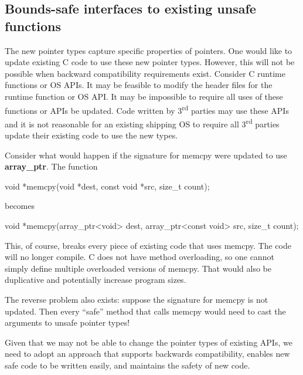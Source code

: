 \subsection{\texorpdfstring{\protect\hypertarget{ux5fToc426641113}{}{\protect\hypertarget{ux5fToc435434972}{}{\protect\hypertarget{ux5fToc437460803}{}{\protect\hypertarget{ux5fRef437611522}{}{\protect\hypertarget{ux5fToc440445484}{}{\protect\hypertarget{ux5fToc440449266}{}{\protect\hypertarget{ux5fToc440551916}{}{}}}}}}}Bounds-safe
interfaces to existing unsafe
functions}{Bounds-safe interfaces to existing unsafe functions}}\label{bounds-safe-interfaces-to-existing-unsafe-functions}

The new pointer types capture specific properties of pointers. One would
like to update existing C code to use these new pointer types. However,
this will not be possible when backward compatibility requirements
exist. Consider C runtime functions or OS APIs. It may be feasible to
modify the header files for the runtime function or OS API. It may be
impossible to require all uses of these functions or APIs be updated.
Code written by 3\textsuperscript{rd} parties may use these APIs and it
is not reasonable for an existing shipping OS to require all
3\textsuperscript{rd} parties update their existing code to use the new
types.

Consider what would happen if the signature for memcpy were updated to
use \textbf{array\_ptr}. The function

void *memcpy(void *dest, const void *src, size\_t count);

becomes

void *memcpy(array\_ptr\textless{}void\textgreater{} dest,
array\_ptr\textless{}const void\textgreater{} src, size\_t count);

This, of course, breaks every piece of existing code that uses memcpy.
The code will no longer compile. C does not have method overloading, so
one cannot simply define multiple overloaded versions of memcpy. That
would also be duplicative and potentially increase program sizes.

The reverse problem also exists: suppose the signature for memcpy is not
updated. Then every ``safe'' method that calls memcpy would need to cast
the arguments to unsafe pointer types!

Given that we may not be able to change the pointer types of existing
APIs, we need to adopt an approach that supports backwards
compatibility, enables new safe code to be written easily, and maintains
the safety of new code.

